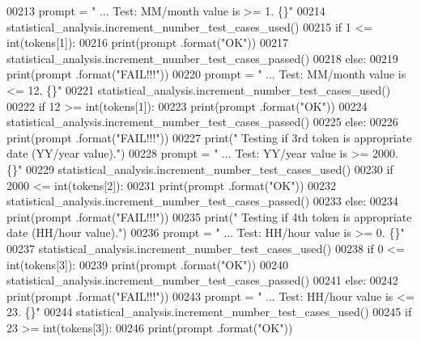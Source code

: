 \begin{DoxyCode}
00213         prompt = \textcolor{stringliteral}{"  ... Test: MM/month value is >= 1.           \{\}"}
00214         statistical\_analysis.increment\_number\_test\_cases\_used()
00215         \textcolor{keywordflow}{if} 1 <= int(tokens[1]):
00216             print(prompt .format(\textcolor{stringliteral}{"OK"}))
00217             statistical\_analysis.increment\_number\_test\_cases\_passed()
00218         \textcolor{keywordflow}{else}:
00219             print(prompt .format(\textcolor{stringliteral}{"FAIL!!!"}))
00220         prompt = \textcolor{stringliteral}{"  ... Test: MM/month value is <= 12.          \{\}"}
00221         statistical\_analysis.increment\_number\_test\_cases\_used()
00222         \textcolor{keywordflow}{if} 12 >= int(tokens[1]):
00223             print(prompt .format(\textcolor{stringliteral}{"OK"}))
00224             statistical\_analysis.increment\_number\_test\_cases\_passed()
00225         \textcolor{keywordflow}{else}:
00226             print(prompt .format(\textcolor{stringliteral}{"FAIL!!!"}))
00227         print(\textcolor{stringliteral}{" Testing if 3rd token is appropriate date (YY/year value)."})
00228         prompt = \textcolor{stringliteral}{"  ... Test: YY/year value is >= 2000.         \{\}"}
00229         statistical\_analysis.increment\_number\_test\_cases\_used()
00230         \textcolor{keywordflow}{if} 2000 <= int(tokens[2]):
00231             print(prompt .format(\textcolor{stringliteral}{"OK"}))
00232             statistical\_analysis.increment\_number\_test\_cases\_passed()
00233         \textcolor{keywordflow}{else}:
00234             print(prompt .format(\textcolor{stringliteral}{"FAIL!!!"}))
00235         print(\textcolor{stringliteral}{" Testing if 4th token is appropriate date (HH/hour value)."})
00236         prompt = \textcolor{stringliteral}{"  ... Test: HH/hour value is >= 0.            \{\}"}
00237         statistical\_analysis.increment\_number\_test\_cases\_used()
00238         \textcolor{keywordflow}{if} 0 <= int(tokens[3]):
00239             print(prompt .format(\textcolor{stringliteral}{"OK"}))
00240             statistical\_analysis.increment\_number\_test\_cases\_passed()
00241         \textcolor{keywordflow}{else}:
00242             print(prompt .format(\textcolor{stringliteral}{"FAIL!!!"}))
00243         prompt = \textcolor{stringliteral}{"  ... Test: HH/hour value is <= 23.           \{\}"}
00244         statistical\_analysis.increment\_number\_test\_cases\_used()
00245         \textcolor{keywordflow}{if} 23 >= int(tokens[3]):
00246             print(prompt .format(\textcolor{stringliteral}{"OK"}))

\end{DoxyCode}
